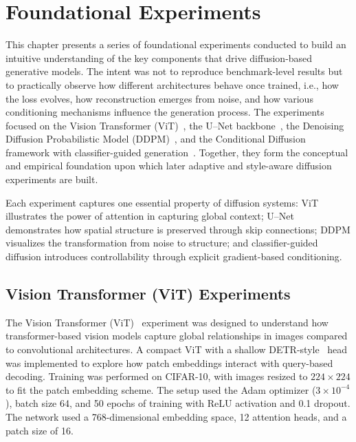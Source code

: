 \chapter{Foundational Experiments}
\label{chap:foundational_experiments}

This chapter presents a series of foundational experiments conducted to build an intuitive understanding of the key components that drive diffusion-based generative models.  
The intent was not to reproduce benchmark-level results but to practically observe how different architectures behave once trained, i.e., how the loss evolves, how reconstruction emerges from noise, and how various conditioning mechanisms influence the generation process.  
The experiments focused on the Vision Transformer (ViT)~\cite{dosovitskiy2020vit}, the U–Net backbone~\cite{ronneberger2015unet}, the Denoising Diffusion Probabilistic Model (DDPM)~\cite{ho2020ddpm}, and the Conditional Diffusion framework with classifier-guided generation~\cite{ho2020ddpm,radford2021clip}.  
Together, they form the conceptual and empirical foundation upon which later adaptive and style-aware diffusion experiments are built.

Each experiment captures one essential property of diffusion systems: ViT illustrates the power of attention in capturing global context; U–Net demonstrates how spatial structure is preserved through skip connections; DDPM visualizes the transformation from noise to structure; and classifier-guided diffusion introduces controllability through explicit gradient-based conditioning.

\section{Vision Transformer (ViT) Experiments}
\label{sec:vit_experiments}

The Vision Transformer (ViT)~\cite{dosovitskiy2020vit} experiment was designed to understand how transformer-based vision models capture global relationships in images compared to convolutional architectures.  
A compact ViT with a shallow DETR-style~\cite{carion2020endtoendobjectdetectiontransformers} head was implemented to explore how patch embeddings interact with query-based decoding.  
Training was performed on CIFAR-10, with images resized to \(224\times224\) to fit the patch embedding scheme.  
The setup used the Adam optimizer (\(3\times10^{-4}\)), batch size 64, and 50 epochs of training with ReLU activation and 0.1 dropout.  
The network used a 768-dimensional embedding space, 12 attention heads, and a patch size of 16.

